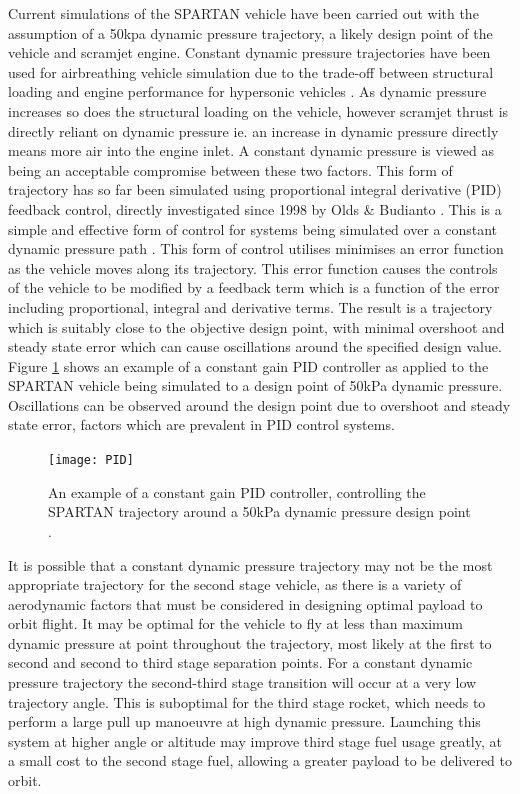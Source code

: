 Current simulations of the SPARTAN vehicle have been carried out with the assumption of a 50kpa dynamic pressure trajectory, a likely design point of the vehicle and scramjet engine. 
 Constant dynamic pressure trajectories have been used for airbreathing vehicle simulation due to the trade-off between structural loading and engine performance for hypersonic vehicles \cite{Olds1998} . As dynamic pressure increases so does the structural loading on the vehicle, however scramjet thrust is directly reliant on dynamic pressure ie. an increase in dynamic pressure directly means more air into the engine inlet. A constant dynamic pressure is viewed as being an acceptable compromise between these two factors.   
This form of trajectory has so far been simulated using proportional integral derivative (PID) feedback control, directly investigated since 1998 by Olds \& Budianto \cite{Olds1998}. This is a simple and effective form of control for systems being simulated over a constant dynamic pressure path \cite{Preller2015}. This form of control utilises minimises an error function as the vehicle moves along its trajectory. This error function causes the controls of the vehicle to be modified by a feedback term which is a function of the error including proportional, integral and derivative terms. The result is a trajectory which is suitably close to the objective design point, with minimal overshoot and steady state error which can cause oscillations around the specified design value. Figure \ref{fig:PID} shows an example of a constant gain PID controller as applied to the SPARTAN vehicle being simulated to a design point of 50kPa dynamic pressure. Oscillations can be observed around the design point due to overshoot and steady state error, factors which are prevalent in PID control systems.

\begin{figure}[ht]
	\centering
	\texttt{[image: PID]}
	\caption{An example of a constant gain PID controller, controlling the SPARTAN trajectory around a 50kPa dynamic pressure design point \cite{Preller2015}.}
	\label{fig:PID}
\end{figure}


It is possible that a constant dynamic pressure trajectory may not be the most appropriate trajectory for the second stage vehicle, as there is a variety of aerodynamic factors that must be considered in designing optimal payload to orbit flight. It may be optimal for the vehicle to fly at less than maximum dynamic pressure at point throughout the trajectory, most likely at the first to second and second to third stage separation points. For a constant dynamic pressure trajectory the second-third stage transition will occur at a very low trajectory angle. This is suboptimal for the third stage rocket, which needs to perform a large pull up manoeuvre at high dynamic pressure. Launching this system at higher angle or altitude may improve third stage fuel usage greatly, at a small cost to the second stage fuel, allowing a greater payload to be delivered to orbit. 

